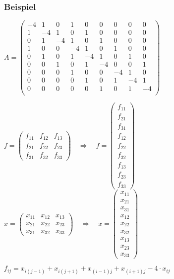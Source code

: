 \begin{frame}
\frametitle{Beispiel}

\tiny\centering
	$	A = \left(
	\begin{array}{ccc|ccc|ccc}
		-4 & 1 & 0  &  1 & 0 & 0 & 0 & 0 & 0 \\
		 1 &-4 & 1  &  0 & 1 & 0 & 0 & 0 & 0 \\
		 0 & 1 & -4 &  1 & 0 & 1 & 0 & 0 & 0 \\\hline
		 1 & 0 & 0  & -4 & 1 & 0 & 1 & 0 & 0 \\
		 0 & 1 & 0  & 1 & -4 & 1 & 0 & 1 & 0 \\
		 0 & 0 & 1  & 0 & 1 & -4 & 0 & 0 & 1 \\\hline
		 0 & 0 & 0  & 1 & 0 & 0 & -4 & 1 & 0 \\
		 0 & 0 & 0  & 0 & 1 & 0 & 1 & -4 & 1 \\
		 0 & 0 & 0  & 0 & 0 & 1 & 0 & 1 & -4 \\
	\end{array}
	\right)
	$
	
	\vspace{3em}
	
	$f = \left(
	\begin{array}{ccc}
		f_{11} & f_{12} & f_{13} \\
		f_{21} & f_{22} & f_{23} \\
		f_{31} & f_{32} & f_{33} 
	\end{array}
	\right) \quad\Rightarrow\quad
	f = \left(
	\begin{array}{c}
		f_{11} \\
		f_{21}\\
		f_{31}\\
		f_{12}\\
		f_{22}\\
		f_{32}\\
		f_{13}\\
		f_{23}\\
		f_{33}
	\end{array}
	\right)$
	\hspace{3em}
	$x = \left(
	\begin{array}{ccc}
		x_{11} & x_{12} & x_{13} \\
		x_{21} & x_{22} & x_{23} \\
		x_{31} & x_{32} & x_{33} 
	\end{array}
	\right) \quad\Rightarrow\quad
	x = \left(
	\begin{array}{c}
		x_{11} \\
		x_{21}\\
		x_{31}\\
		x_{12}\\
		x_{22}\\
		x_{32}\\
		x_{13}\\
		x_{23}\\
		x_{33}
	\end{array}
	\right)$
	
	\scriptsize
	\vspace{3em}
	$f_{ij}= x_{i(j-1)} + x_{i(j+1)} + x_{(i-1)j} + x_{(i+1)j}- 4\cdot x_{ij}$
\end{frame}